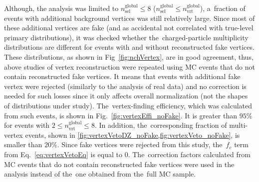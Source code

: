 Although, the analysis was limited to $n_\textrm{sel}^\textrm{global}\leq8$ ($n_\textrm{sel}^\textrm{global}\leq n_\textrm{vrt}^\textrm{global}$), a~fraction  of events  with additional background vertices was still relatively large.
Since most of these additional vertices are fake (and as accidental not correlated with true-level primary distributions), it was checked whether the~charged-particle multiplicity distributions are different for events with and without reconstructed fake vertices. These distributions, as shown in Fig~\ref{fig:nchVertex}, are in good agreement, thus, above studies of vertex reconstruction were repeated using \ac{MC} events that do not contain reconstructed fake vertices. It means that events with additional fake vertex  were rejected (similarly to the analysis of real data) and no correction is needed for such losses  since it only affects overall normalization (not the shapes of distributions under study). The~vertex-finding efficiency, which was  calculated from such events, is shown in Fig.~\ref{fig:vertexEffi_noFake}. It is greater than $95\%$ for events with $2 \leq n_\textrm{vrt}^\textrm{global}\leq 8$. 
In addition, the~corresponding fraction of multi-vertex events, shown in \cref{fig:vertexVetoDZ_noFake,fig:vertexVeto_noFake}, is smaller than $20\%$. Since fake vertices were rejected from this study, the~$f_{c}$ term from Eq.~\eqref{eq:vertexVetoEq} is equal to $0$. The~correction factors calculated from \ac{MC} events that do not contain reconstructed fake vertices  were used in the analysis instead of the~one obtained from the~full \ac{MC} sample.








